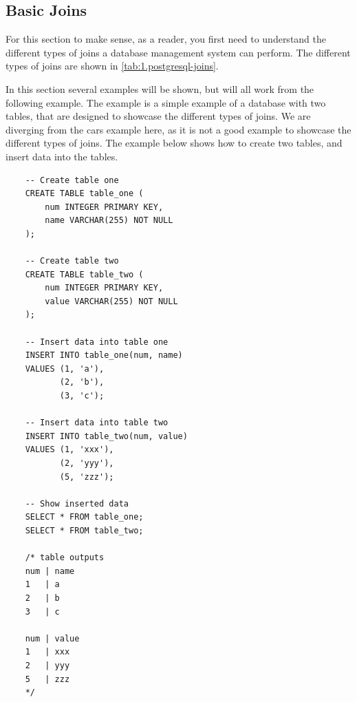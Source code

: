 \subsection{Basic Joins}
For this section to make sense, as a reader, you first need to understand the different types of joins a database management system can perform. The different types of joins are shown in \cref{tab:1.postgresql-joins}.

\begin{table}[htb]
    \centering
    \caption{Commonly used joins in PostgreSQL}
    \label{tab:1.postgresql-joins}
\end{table}

In this section several examples will be shown, but will all work from the following example. The example is a simple example of a database with two tables, that are designed to showcase the different types of joins. We are diverging from the cars example here, as it is not a good example to showcase the different types of joins. The example below shows how to create two tables, and insert data into the tables.

\begin{verbatim}
    -- Create table one
    CREATE TABLE table_one (
        num INTEGER PRIMARY KEY,
        name VARCHAR(255) NOT NULL
    );

    -- Create table two
    CREATE TABLE table_two (
        num INTEGER PRIMARY KEY,
        value VARCHAR(255) NOT NULL
    );

    -- Insert data into table one
    INSERT INTO table_one(num, name)
    VALUES (1, 'a'),
           (2, 'b'),
           (3, 'c');

    -- Insert data into table two
    INSERT INTO table_two(num, value)
    VALUES (1, 'xxx'),
           (2, 'yyy'),
           (5, 'zzz');
    
    -- Show inserted data
    SELECT * FROM table_one;
    SELECT * FROM table_two;

    /* table outputs
    num | name
    1   | a
    2   | b
    3   | c
    
    num | value
    1   | xxx
    2   | yyy
    5   | zzz
    */
\end{verbatim}

